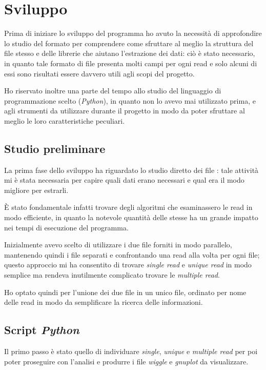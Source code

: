 \clearpage
\section{Sviluppo}
Prima di iniziare lo sviluppo del programma ho avuto la necessità di approfondire lo studio del formato  per comprendere come sfruttare al meglio la struttura del file stesso e delle librerie che aiutano l'estrazione dei dati: ciò è stato necessario, in quanto tale formato di file presenta molti campi per ogni read e solo alcuni di essi sono risultati essere davvero utili agli scopi del progetto.

Ho riservato inoltre una parte del tempo allo studio del linguaggio di programmazione scelto (\emph{Python}), in quanto non lo avevo mai utilizzato prima, e agli strumenti da utilizzare durante il progetto in modo da poter sfruttare al meglio le loro caratteristiche peculiari.

\subsection{Studio preliminare}
La prima fase dello sviluppo ha riguardato lo studio diretto dei file : tale attività mi è stata necessaria per capire quali dati erano necessari e qual era il modo migliore per estrarli.

È stato fondamentale infatti trovare degli algoritmi che esaminassero le read in modo efficiente, in quanto la notevole quantità delle stesse ha un grande impatto nei tempi di esecuzione del programma.

Inizialmente avevo scelto di utilizzare i due file  forniti in modo parallelo, mantenendo quindi i file separati e confrontando una read alla volta per ogni file; questo approccio mi ha consentito di trovare \emph{single read} e \emph{unique read} in modo semplice ma rendeva inutilmente complicato trovare le \emph{multiple read}.

Ho optato quindi per l'unione dei due file in un unico file, ordinato per nome delle read in modo da semplificare la ricerca delle informazioni.

\subsection{Script \emph{Python}}
Il primo passo è stato quello di individuare \emph{single}, \emph{unique} e \emph{multiple read} per poi poter proseguire con l'analisi e produrre i file \emph{wiggle} e \emph{gnuplot} da visualizzare.

